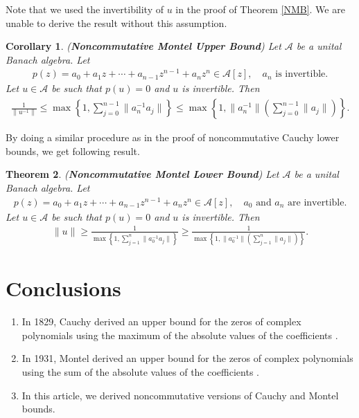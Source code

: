 \documentclass{amsart}
\newtheorem{theorem}{Theorem}[section]
\newtheorem{corollary}[theorem] {Corollary}
\begin{document}
Note that we used the invertibility of $u$ in the proof of Theorem \ref{NMB}. We are unable to derive the result without this assumption. 
\begin{corollary}
(\textbf{Noncommutative Montel Upper Bound}) Let $\mathcal{A}$ be a unital Banach algebra. Let 
\begin{align*}
	p(z)=a_0+a_1z+\cdots+a_{n-1}z^{n-1}+a_nz^n\in \mathcal{A}[z], \quad a_n \text{ is invertible}.
\end{align*}
Let $u \in \mathcal{A}$ be such that $p(u)=0$ and $u$ is invertible. Then
\begin{align*}
	\frac{1}{\|u^{-1}\|}\leq \max\left\{1, \sum_{j=0}^{n-1}\|a_n^{-1}a_j\|\right\}\leq \max\left\{1,\|a_n^{-1} \|\left(\sum_{j=0}^{n-1}\|a_j\|\right)\right\}.
\end{align*}	
\end{corollary}
By doing a similar procedure as in the proof of noncommutative Cauchy lower bounds, we get following result. 
\begin{theorem}
(\textbf{Noncommutative Montel Lower Bound}) Let $\mathcal{A}$ be a unital Banach algebra. Let 
\begin{align*}
	p(z)=a_0+a_1z+\cdots+a_{n-1}z^{n-1}+a_nz^n\in \mathcal{A}[z], \quad a_0 \text{ and } a_n \text{ are invertible}.
\end{align*}
Let $u \in \mathcal{A}$ be such that $p(u)=0$ and $u$ is invertible. Then
\begin{align*}
	\|u\|\geq \frac{1}{\max\left\{1, \sum_{j=1}^{n}\|a_0^{-1}a_j\|\right\}}\geq  \frac{1}{\max\left\{1,\|a_0^{-1} \|\left(\sum_{j=1}^{n}\|a_j\|\right)\right\}}.
\end{align*}	
\end{theorem}





 \section{Conclusions}
 \begin{enumerate}
 	\item In 1829, Cauchy derived an upper bound for the zeros of complex polynomials using the maximum of the absolute values of the coefficients \cite{CAUCHY}. 
 	\item In 1931, Montel derived  an upper bound for the zeros of complex polynomials using the sum of the absolute values of the coefficients \cite{MONTEL}.
 	\item In this article, we  derived noncommutative versions of Cauchy and Montel bounds. 
 \end{enumerate}
 
 
 
 
 
 
\end{document}
